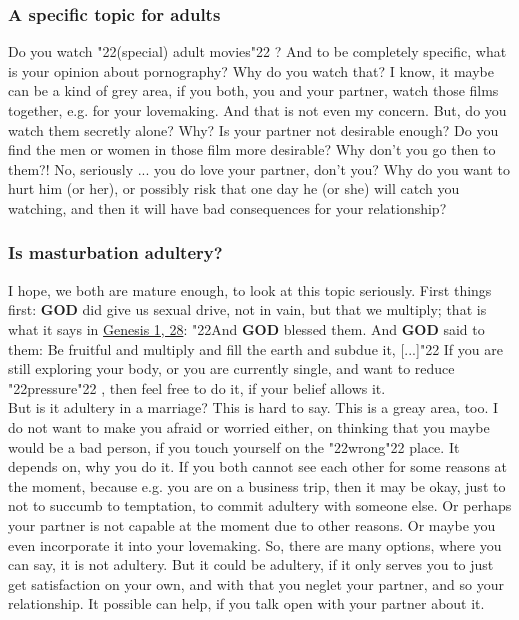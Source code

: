 \documentclass[10pt,a5paper]{article}
\newcommand{\God}[0]{\textbf{GOD}}
\newcommand{\q}[1]{\char"22{#1}\char"22 }
\begin{document}
	\subsubsection{A specific topic for adults}
		Do you watch \q{(special) adult movies}?
		And to be completely specific,
		what is your opinion about pornography?
		Why do you watch that?
		I know,
		it maybe can be a kind of grey area,
		if you both,
		you and your partner,
		watch those films together,
		e.g. for your lovemaking.
		And that is not even my concern.
		But,
		do you watch them secretly alone?
		Why?
		Is your partner not desirable enough?
		Do you find the men or women in those film more desirable?
		Why don't you go then to them?!
		No,
		seriously ...
		you do love your partner, don't you?
		Why do you want to hurt him (or her),
		or possibly risk that one day he (or she) will catch you watching,
		and then it will have bad consequences for your relationship?
		
	\subsubsection{Is masturbation adultery?}
		I hope,
		we both are mature enough,
		to look at this topic seriously.
		First things first:
		{\God} did give us sexual drive,
		not in vain,
		but that we multiply;
		that is what it says in \href{https://www.die-bibel.de/bibeln/online-bibeln/lesen/ESV/GEN.1/Genesis-1}{Genesis 1, 28}:
		\q{And {\God} blessed them.
		And {\God} said to them:
		Be fruitful and multiply and fill the earth and subdue it, [...]}
		If you are still exploring your body,
		or you are currently single,
		and want to reduce \q{pressure},
		then feel free to do it,
		if your belief allows it.
		\\
		But is it adultery in a marriage?
		This is hard to say.
		This is a greay area, too.
		I do not want to make you afraid or worried either,
		on thinking that you maybe would be a bad person,
		if you touch yourself on the \q{wrong} place.
		It depends on,
		why you do it.
		If you both cannot see each other for some reasons at the moment,
		because e.g. you are on a business trip,
		then it may be okay,
		just to not to succumb to temptation,
		to commit adultery with someone else.
		Or perhaps your partner is not capable at the moment due to other reasons.
		Or maybe you even incorporate it into your lovemaking.
		So,
		there are many options,
		where you can say,
		it is not adultery.
		But it could be adultery,
		if it only serves you to just get satisfaction on your own,
		and with that you neglet your partner,
		and so your relationship.
		It possible can help,
		if you talk open with your partner about it.
		
\end{document}
